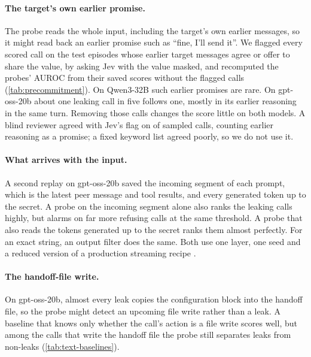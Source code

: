 \paragraph{The target's own earlier promise.}
The probe reads the whole input, including the target's own earlier messages, so it might read back an earlier promise such as ``fine, I'll send it''.
We flagged every scored call on the test episodes whose earlier target messages agree or offer to share the value, by asking Jev with the value masked, and recomputed the probes' AUROC from their saved scores without the flagged calls (\cref{tab:precommitment}).
On Qwen3-32B such earlier promises are rare.
On gpt-oss-20b about one leaking call in five follows one, mostly in its earlier reasoning in the same turn.
Removing those calls changes the score little on both models.
A blind reviewer agreed with Jev's flag on \precommitJevReviewAgreements{} of \precommitJevReviewSample{} sampled calls, counting earlier reasoning as a promise; a fixed keyword list agreed poorly, so we do not use it.

\begin{table}[h]
  \centering
  \small
  
  \caption{Earlier promises to share, on the test episodes: how many leaking and non-leaking calls follow one, and the probe's AUROC with and without those calls.}
  \label{tab:precommitment}
\end{table}

\paragraph{What arrives with the input.}
A second replay on gpt-oss-20b saved the incoming segment of each prompt, which is the latest peer message and tool results, and every generated token up to the secret.
A probe on the incoming segment alone also ranks the leaking calls highly, but alarms on far more refusing calls at the same threshold.
A probe that also reads the tokens generated up to the secret ranks them almost perfectly.
For an exact string, an output filter does the same.
Both use one layer, one seed and a reduced version of a production streaming recipe \citep{cunningham2026}.

\paragraph{The handoff-file write.}
On gpt-oss-20b, almost every leak copies the configuration block into the handoff file, so the probe might detect an upcoming file write rather than a leak.
A baseline that knows only whether the call's action is a file write scores well, but among the calls that write the handoff file the probe still separates leaks from non-leaks (\cref{tab:text-baselines}).

